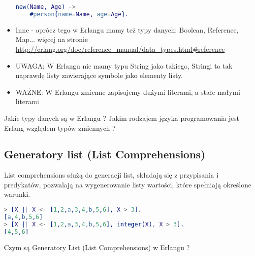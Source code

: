 \documentclass[a4paper,15pt]{article}
\newcommand{\ask}[2]{
    \begin{tcolorbox}[colback=black!5!white,colframe=gray,title={Pytanie #1}]
        #2
    \end{tcolorbox}
}
\begin{document}
\begin{itemize}
\begin{lstlisting}[language=Erlang]
new(Name, Age) ->
    #person{name=Name, age=Age}.
\end{lstlisting}
\item Inne - oprócz tego w Erlangu mamy też typy danych: Boolean, Reference, Map... więcej na stronie \url{http://erlang.org/doc/reference_manual/data_types.html#reference}
\item UWAGA: W Erlangu nie mamy typu String jako takiego, Stringi to tak naprawdę listy zawierające symbole jako elementy listy.
\item WAŻNE: W Erlangu zmienne zapisujemy dużymi literami, a stałe małymi literami
\end{itemize}


\ask{}{
Jakie typy danych są w Erlangu ? Jakim rodzajem języka programowania jest Erlang względem typów zmiennych ?
}

\subsection{Generatory list (List Comprehensions)}
List comprehensions służą do generacji list, składają się z przypisania i predykatów, pozwalają na wygenerowanie listy wartości, które spełniają określone warunki. 
\begin{lstlisting}[language=Erlang]
> [X || X <- [1,2,a,3,4,b,5,6], X > 3].
[a,4,b,5,6]
> [X || X <- [1,2,a,3,4,b,5,6], integer(X), X > 3].
[4,5,6]
\end{lstlisting}


\ask{}{
Czym są Generatory List (List Comprehensions) w Erlangu ?
}
\end{document}
